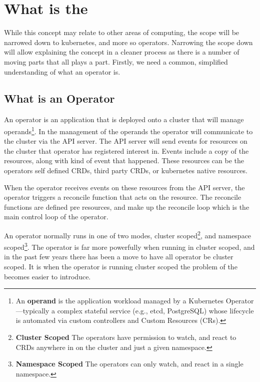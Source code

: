 
\section{What is the \nn{}}
\label{sec:what_is}

While this concept may relate to other areas of computing, the scope will be narrowed down to kubernetes\cite{noauthor_production-grade_nodate}, and more so operators\cite{noauthor_operator_nodate}.
Narrowing the scope down will allow explaining the concept in a  cleaner process as there is a number of moving parts that all plays a part.
Firstly, we need a common, simplified understanding of what an operator is.

\subsection{What is an Operator}

An operator is an application that is deployed onto a cluster\cite{noauthor_cluster_nodate} that will manage operands\footnote{An \textbf{operand} is the application workload managed by a Kubernetes Operator—typically a complex stateful service (e.g., etcd, PostgreSQL) whose lifecycle is automated via custom controllers and Custom Resources (CRs).}.
In the management of the operands the operator will communicate to the cluster via the API server\cite{noauthor_kube-apiserver_nodate}.
The API server will send events for resources on the cluster that operator has registered interest in.
Events include a copy of the resources, along with kind of event that happened.
These resources can be the operators self defined CRDs\cite{noauthor_extend_nodate}, third party CRDs, or kubernetes native resources.

When the operator receives events on these resources from the API server, the operator triggers a reconcile function that acts on the resource. The reconcile functions are defined pre resources, and make up the reconcile loop which is the main control loop of the operator.

An operator normally runs in one of two modes,
cluster scoped\footnote{\textbf{Cluster Scoped} The operators have permission to watch, and react to CRDs anywhere in on the cluster and just a given namespace.}, and namespace scoped\footnote{\textbf{Namespace Scoped} The operators can only watch, and react in a single namespace.}.
The operator is far more powerfully when running in cluster scoped, and in the past few years there has been a move to have all operator be cluster scoped.\cite{koserwal_migrating_2020}
It is when the operator is running cluster scoped the problem of the \nn{} becomes easier to introduce.

